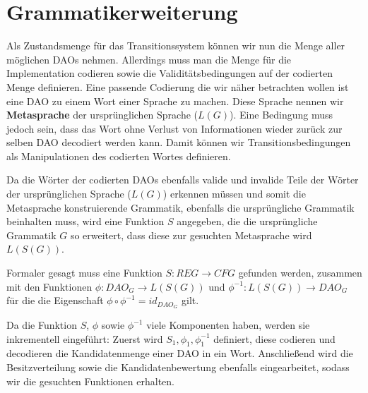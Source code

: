 \documentclass[a4paper,12pt]{report}
\begin{document}
% 

% 




\section{Grammatikerweiterung}
\label{gramerw}
Als Zustandsmenge für das Transitionssystem können wir nun die Menge aller möglichen DAOs nehmen. Allerdings muss man die Menge für die Implementation codieren sowie die Validitätsbedingungen auf der codierten Menge definieren. Eine passende Codierung die wir näher betrachten wollen ist eine DAO zu einem Wort einer Sprache zu machen. Diese Sprache nennen wir \textbf{Metasprache} der ursprünglichen Sprache ($L(G)$). Eine Bedingung muss jedoch sein, dass das Wort ohne Verlust von Informationen wieder zurück zur selben DAO decodiert werden kann. Damit können wir Transitionsbedingungen als Manipulationen des codierten Wortes definieren. 

Da die Wörter der codierten DAOs ebenfalls valide und invalide Teile der Wörter der ursprünglichen Sprache ($L(G)$) erkennen müssen und somit die Metasprache konstruierende Grammatik, ebenfalls die ursprüngliche Grammatik beinhalten muss, wird eine Funktion $S$ angegeben, die die ursprüngliche Grammatik $G$ so erweitert, dass diese zur gesuchten Metasprache wird $L(S(G))$.

Formaler gesagt muss eine Funktion $S: REG\rightarrow CFG$ gefunden werden, zusammen mit den Funktionen $\phi: DAO_G \rightarrow L(S(G))$ und $\phi^{-1}: L(S(G)) \rightarrow DAO_G$ für die die Eigenschaft $\phi\circ\phi^{-1} = id_{DAO_G}$ gilt.

Da die Funktion $S$, $\phi$ sowie $\phi^{-1}$ viele Komponenten haben, werden sie inkrementell eingeführt: Zuerst wird $S_1, \phi_1, \phi^{-1}_1$ definiert, diese codieren und decodieren die Kandidatenmenge einer DAO in ein Wort. Anschließend wird die Besitzverteilung sowie die Kandidatenbewertung ebenfalls eingearbeitet, sodass wir die gesuchten Funktionen erhalten.
\end{document}
